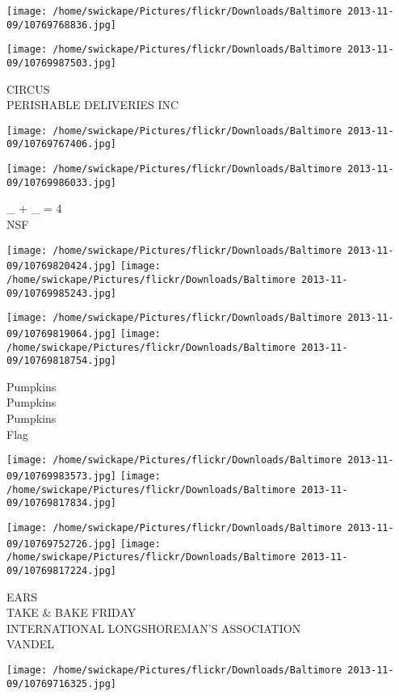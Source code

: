 \documentclass[10pt,letterpaper]{article}
\begin{document}
\texttt{[image: /home/swickape/Pictures/flickr/Downloads/Baltimore 2013-11-09/10769768836.jpg]}

\vspace{0.25in}
\texttt{[image: /home/swickape/Pictures/flickr/Downloads/Baltimore 2013-11-09/10769987503.jpg]}

CIRCUS\\
PERISHABLE DELIVERIES INC
\pagebreak

\texttt{[image: /home/swickape/Pictures/flickr/Downloads/Baltimore 2013-11-09/10769767406.jpg]}

\vspace{0.25in}
\texttt{[image: /home/swickape/Pictures/flickr/Downloads/Baltimore 2013-11-09/10769986033.jpg]}

\_ + \_ = 4\\
NSF
\pagebreak

\texttt{[image: /home/swickape/Pictures/flickr/Downloads/Baltimore 2013-11-09/10769820424.jpg]}
\texttt{[image: /home/swickape/Pictures/flickr/Downloads/Baltimore 2013-11-09/10769985243.jpg]}

\texttt{[image: /home/swickape/Pictures/flickr/Downloads/Baltimore 2013-11-09/10769819064.jpg]}
\texttt{[image: /home/swickape/Pictures/flickr/Downloads/Baltimore 2013-11-09/10769818754.jpg]}

Pumpkins\\
Pumpkins\\
Pumpkins\\
Flag
\pagebreak

\texttt{[image: /home/swickape/Pictures/flickr/Downloads/Baltimore 2013-11-09/10769983573.jpg]}
\texttt{[image: /home/swickape/Pictures/flickr/Downloads/Baltimore 2013-11-09/10769817834.jpg]}

\texttt{[image: /home/swickape/Pictures/flickr/Downloads/Baltimore 2013-11-09/10769752726.jpg]}
\texttt{[image: /home/swickape/Pictures/flickr/Downloads/Baltimore 2013-11-09/10769817224.jpg]}

EARS\\
TAKE \& BAKE FRIDAY\\
INTERNATIONAL LONGSHOREMAN'S ASSOCIATION\\
VANDEL
\pagebreak

\texttt{[image: /home/swickape/Pictures/flickr/Downloads/Baltimore 2013-11-09/10769716325.jpg]}
\end{document}
